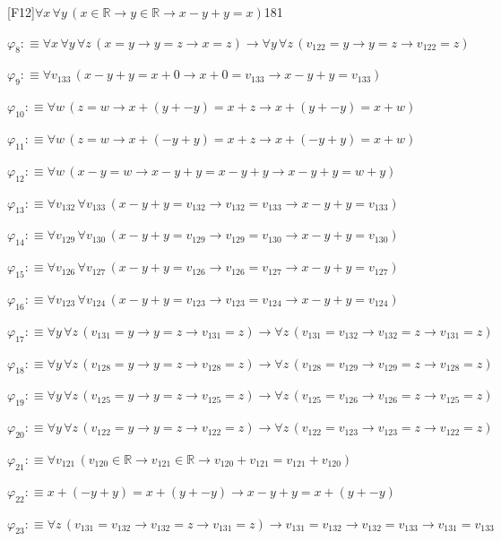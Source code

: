 \begin{fullproof}{[F12]}{$\forall x\,\forall y\,(x \in \mathbb{R} \to y \in \mathbb{R} \to x - y + y = x)$}{181}
\begin{abbrevlist}
\item $\varphi_{8} :\equiv \forall x\,\forall y\,\forall z\,(x = y \to y = z \to x = z) \to \forall y\,\forall z\,(v_{122} = y \to y = z \to v_{122} = z)$
\item $\varphi_{9} :\equiv \forall v_{133}\,(x - y + y = x + 0 \to x + 0 = v_{133} \to x - y + y = v_{133})$
\item $\varphi_{10} :\equiv \forall w\,(z = w \to x + (y + -y) = x + z \to x + (y + -y) = x + w)$
\item $\varphi_{11} :\equiv \forall w\,(z = w \to x + (-y + y) = x + z \to x + (-y + y) = x + w)$
\item $\varphi_{12} :\equiv \forall w\,(x - y = w \to x - y + y = x - y + y \to x - y + y = w + y)$
\item $\varphi_{13} :\equiv \forall v_{132}\,\forall v_{133}\,(x - y + y = v_{132} \to v_{132} = v_{133} \to x - y + y = v_{133})$
\item $\varphi_{14} :\equiv \forall v_{129}\,\forall v_{130}\,(x - y + y = v_{129} \to v_{129} = v_{130} \to x - y + y = v_{130})$
\item $\varphi_{15} :\equiv \forall v_{126}\,\forall v_{127}\,(x - y + y = v_{126} \to v_{126} = v_{127} \to x - y + y = v_{127})$
\item $\varphi_{16} :\equiv \forall v_{123}\,\forall v_{124}\,(x - y + y = v_{123} \to v_{123} = v_{124} \to x - y + y = v_{124})$
\item $\varphi_{17} :\equiv \forall y\,\forall z\,(v_{131} = y \to y = z \to v_{131} = z) \to \forall z\,(v_{131} = v_{132} \to v_{132} = z \to v_{131} = z)$
\item $\varphi_{18} :\equiv \forall y\,\forall z\,(v_{128} = y \to y = z \to v_{128} = z) \to \forall z\,(v_{128} = v_{129} \to v_{129} = z \to v_{128} = z)$
\item $\varphi_{19} :\equiv \forall y\,\forall z\,(v_{125} = y \to y = z \to v_{125} = z) \to \forall z\,(v_{125} = v_{126} \to v_{126} = z \to v_{125} = z)$
\item $\varphi_{20} :\equiv \forall y\,\forall z\,(v_{122} = y \to y = z \to v_{122} = z) \to \forall z\,(v_{122} = v_{123} \to v_{123} = z \to v_{122} = z)$
\item $\varphi_{21} :\equiv \forall v_{121}\,(v_{120} \in \mathbb{R} \to v_{121} \in \mathbb{R} \to v_{120} + v_{121} = v_{121} + v_{120})$
\item $\varphi_{22} :\equiv x + (-y + y) = x + (y + -y) \to x - y + y = x + (y + -y)$
\item $\varphi_{23} :\equiv \forall z\,(v_{131} = v_{132} \to v_{132} = z \to v_{131} = z) \to v_{131} = v_{132} \to v_{132} = v_{133} \to v_{131} = v_{133}$

\end{abbrevlist}
\end{fullproof}
